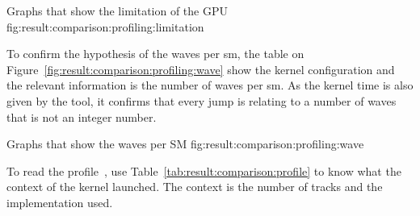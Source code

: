 {Graphs that show the limitation of the GPU}
{fig:result:comparison:profiling:limitation}

To confirm the hypothesis of the waves per \acrshort{sm}, the table on
Figure~\ref{fig:result:comparison:profiling:wave} show the kernel configuration
and the relevant information is the number of waves per \acrshort{sm}.
As the kernel time is also given by the tool, it confirms that every jump is
relating to a number of waves that is not an integer number.

{Graphs that show the waves per SM}
{fig:result:comparison:profiling:wave}

To read the profile~\cite{nsight-profile}, use Table~\ref{tab:result:comparison:profile} to know
what the context of the kernel launched.
The context is the number of tracks and the implementation used.

